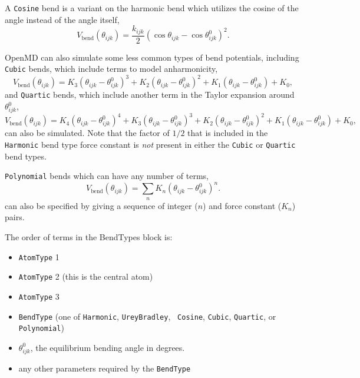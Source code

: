 \documentclass[letterpaper]{report}
\begin{document}
A {\tt Cosine} bend is a variant on the harmonic bend which utilizes
the cosine of the angle instead of the angle itself,
\begin{equation}
V_{\text{bend}}(\theta_{ijk}) = \frac{k_{ijk}}{2}( \cos\theta_{ijk} -
\cos \theta_{ijk}^0 )^2. \label{eq:cosBend}
\end{equation}

OpenMD can also simulate some less common types of bend potentials,
including {\tt Cubic} bends, which include terms to model anharmonicity,
\begin{equation}
V_{\text{bend}}(\theta_{ijk}) =  K_3 (\theta_{ijk} -  \theta_{ijk}^0)^3 + K_2 (\theta_{ijk} -  \theta_{ijk}^0)^2 + K_1 (\theta_{ijk} -  \theta_{ijk}^0) + K_0,
\end{equation}
and {\tt Quartic} bends, which include another term in the Taylor
expansion around $\theta_{ijk}^0$,
\begin{equation}
  V_{\text{bend}}(\theta_{ijk}) = K_4 (\theta_{ijk} -  \theta_{ijk}^0)^4 +  K_3 (\theta_{ijk} -  \theta_{ijk}^0)^3 +
  K_2 (\theta_{ijk} -  \theta_{ijk}^0)^2 + K_1 (\theta_{ijk} -
  \theta_{ijk}^0) + K_0,
\end{equation}
can also be simulated.  Note that the factor of $1/2$ that is included
in the {\tt Harmonic} bend type force constant is {\it not} present in
either the {\tt Cubic} or {\tt Quartic} bend types.

{\tt Polynomial} bends which can have any number of terms,
\begin{equation}
V_{\text{bend}}(\theta_{ijk}) = \sum_n K_n (\theta_{ijk} -  \theta_{ijk}^0)^n.
\end{equation}
can also be specified by giving a sequence of integer ($n$) and force
constant ($K_n$) pairs.

The order of terms in the BendTypes block is:
\begin{itemize}
\item {\tt AtomType} 1
\item {\tt AtomType} 2 (this is the central atom)
\item {\tt AtomType} 3
\item {\tt BendType} (one of {\tt Harmonic}, {\tt UreyBradley}, {\tt
    Cosine}, {\tt Cubic}, {\tt Quartic}, or {\tt Polynomial})
\item $\theta_{ijk}^0$, the equilibrium bending angle in degrees.
\item any other parameters required by the {\tt BendType}
\end{itemize}
\end{document}
